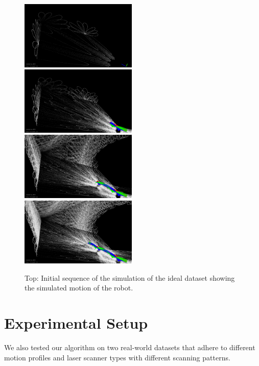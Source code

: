 \documentclass[5p]{elsarticle}
\begin{document}
\begin{figure}
	\centering
	\includegraphics[width=0.495\textwidth]{images/sim_frame_00.png}\hfill
	\includegraphics[width=0.495\textwidth]{images/sim_frame_02.png}\\
	\includegraphics[width=0.495\textwidth]{images/sim_frame_06.png}\hfill
	\includegraphics[width=0.495\textwidth]{images/sim_frame_08.png}\\
	\caption{Top: Initial sequence of the simulation of the ideal dataset showing the simulated motion of the robot.}
	\label{fig:robotRender}
\end{figure}

\section{Experimental Setup}\label{sec:experimentalSetup}

We also tested our algorithm on two real-world datasets that adhere to different motion profiles and laser scanner types with different scanning patterns.
\end{document}
